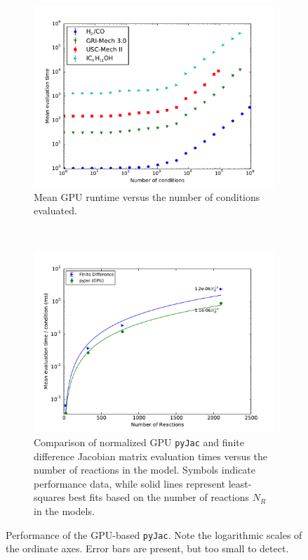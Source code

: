 \documentclass[preprint,12pt]{elsarticle}
\begin{document}
{\begin{figure}[tbp]
    \centering
    \begin{subfigure}{0.75\textwidth}
        \centering
        \includegraphics[width=\textwidth]{gpu.pdf}
        \caption{Mean GPU runtime versus the number of conditions evaluated.}
        \label{F:gpu_mean}
    \end{subfigure}%
    \\
    \begin{subfigure}{0.75\textwidth}
        \centering
        \includegraphics[width=\textwidth]{gpu_norm.pdf}
        \caption{Comparison of normalized GPU \texttt{pyJac} and finite difference Jacobian matrix evaluation times versus the number of reactions in the model. Symbols indicate performance data, while solid lines represent least-squares best fits based on the number of reactions $N_R$ in the models.}
        \label{F:gpu_norm}
    \end{subfigure}
    \caption{Performance of the GPU-based \texttt{pyJac}.
    Note the logarithmic scales of the ordinate axes.
    Error bars are present, but too small to detect.}
    \label{F:gpu_perf}
\end{figure}

}
\end{document}
